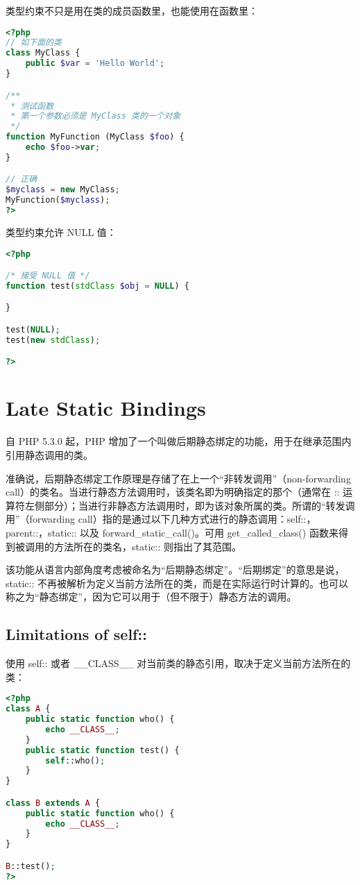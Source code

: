 类型约束不只是用在类的成员函数里，也能使用在函数里：


\begin{lstlisting}[language=PHP]
<?php
// 如下面的类
class MyClass {
    public $var = 'Hello World';
}

/**
 * 测试函数
 * 第一个参数必须是 MyClass 类的一个对象
 */
function MyFunction (MyClass $foo) {
    echo $foo->var;
}

// 正确
$myclass = new MyClass;
MyFunction($myclass);
?>
\end{lstlisting}

类型约束允许 NULL 值：


\begin{lstlisting}[language=PHP]
<?php

/* 接受 NULL 值 */
function test(stdClass $obj = NULL) {

}

test(NULL);
test(new stdClass);

?>
\end{lstlisting}


\chapter{Late Static Bindings}

自 PHP 5.3.0 起，PHP 增加了一个叫做后期静态绑定的功能，用于在继承范围内引用静态调用的类。

准确说，后期静态绑定工作原理是存储了在上一个“非转发调用”（non-forwarding call）的类名。当进行静态方法调用时，该类名即为明确指定的那个（通常在 :: 运算符左侧部分）；当进行非静态方法调用时，即为该对象所属的类。所谓的“转发调用”（forwarding call）指的是通过以下几种方式进行的静态调用：self::，parent::，static:: 以及 forward\_static\_call()。可用 get\_called\_class() 函数来得到被调用的方法所在的类名，static:: 则指出了其范围。

该功能从语言内部角度考虑被命名为“后期静态绑定”。“后期绑定”的意思是说，static:: 不再被解析为定义当前方法所在的类，而是在实际运行时计算的。也可以称之为“静态绑定”，因为它可以用于（但不限于）静态方法的调用。


\section{Limitations of self::}

使用 self:: 或者 \_\_CLASS\_\_ 对当前类的静态引用，取决于定义当前方法所在的类：


\begin{lstlisting}[language=PHP]
<?php
class A {
    public static function who() {
        echo __CLASS__;
    }
    public static function test() {
        self::who();
    }
}

class B extends A {
    public static function who() {
        echo __CLASS__;
    }
}

B::test();
?>
\end{lstlisting}

